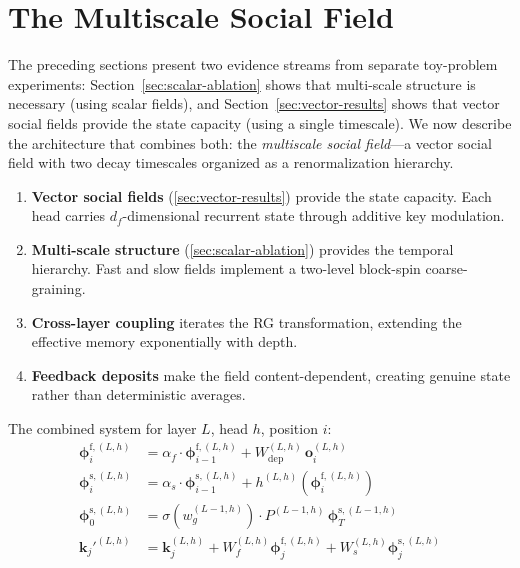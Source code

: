 \documentclass[11pt,a4paper]{article}
\newcommand{\vfield}{\boldsymbol{\phi}}
\newcommand{\retain}{\alpha}
\newcommand{\K}{\mathbf{k}}
\begin{document}
\section{The Multiscale Social Field}
\label{sec:combined}

The preceding sections present two evidence streams from separate
toy-problem experiments: Section~\ref{sec:scalar-ablation} shows that
multi-scale structure is necessary (using scalar fields), and
Section~\ref{sec:vector-results} shows that vector social fields
provide the state capacity (using a single timescale).  We now
describe the architecture that combines both: the \emph{multiscale
social field}---a vector social field with two decay timescales
organized as a renormalization hierarchy.

\begin{enumerate}
  \item \textbf{Vector social fields}
    (\cref{sec:vector-results}) provide the state capacity.  Each
    head carries $d_f$-dimensional recurrent state through additive
    key modulation.
  \item \textbf{Multi-scale structure}
    (\cref{sec:scalar-ablation}) provides the temporal hierarchy.
    Fast and slow fields implement a two-level block-spin
    coarse-graining.
  \item \textbf{Cross-layer coupling} iterates the RG
    transformation, extending the effective memory exponentially with
    depth.
  \item \textbf{Feedback deposits} make the field content-dependent,
    creating genuine state rather than deterministic averages.
\end{enumerate}

The combined system for layer $L$, head $h$, position $i$:
\begin{align}
  \vfield^{\mathrm{f},(L,h)}_i &= \retain_f \cdot
    \vfield^{\mathrm{f},(L,h)}_{i-1}
    + W_{\mathrm{dep}}^{(L,h)} \, \mathbf{o}_i^{(L,h)}
    \label{eq:combined-fast} \\
  \vfield^{\mathrm{s},(L,h)}_i &= \retain_s \cdot
    \vfield^{\mathrm{s},(L,h)}_{i-1}
    + h^{(L,h)}\!\left(\vfield^{\mathrm{f},(L,h)}_i\right)
    \label{eq:combined-slow} \\
  \vfield^{\mathrm{s},(L,h)}_0 &= \sigma\!\left(w_g^{(L-1,h)}\right)
    \cdot P^{(L-1,h)} \, \vfield^{\mathrm{s},(L-1,h)}_T
    \label{eq:combined-cross} \\
  \K_j'^{(L,h)} &= \K_j^{(L,h)}
    + W_f^{(L,h)} \vfield^{\mathrm{f},(L,h)}_j
    + W_s^{(L,h)} \vfield^{\mathrm{s},(L,h)}_j
    \label{eq:combined-keys}
\end{align}
\end{document}
